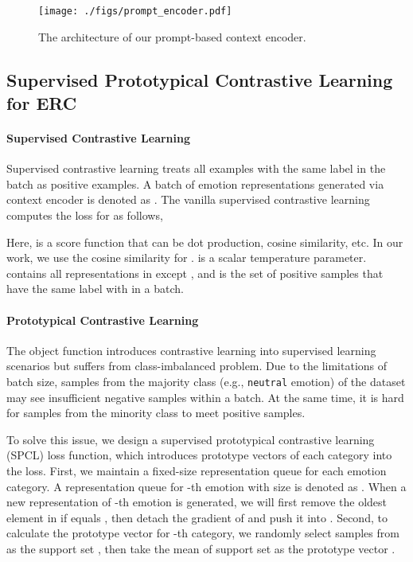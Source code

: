 \documentclass[11pt]{article}
\begin{document}
\begin{figure}
    \centering
    \texttt{[image: ./figs/prompt\_encoder.pdf]}
    \caption{The architecture of our prompt-based context encoder.}
    \label{fig:encoder}
\end{figure}
\subsection{Supervised Prototypical Contrastive Learning for ERC}


\paragraph{Supervised Contrastive Learning}
Supervised contrastive learning\cite{khosla2020supervised} treats all examples with the same label in the batch as positive examples. A batch of  emotion representations generated via context encoder is denoted as . The vanilla supervised contrastive learning computes the loss   for  as follows,






Here,  is a score function that can be dot production, cosine similarity, etc. In our work, we use the cosine similarity for .  is a scalar temperature parameter.  contains all representations in  except , and  is the set of positive samples that have the same label with  in a batch.








\paragraph{Prototypical Contrastive Learning}
The object function  introduces contrastive learning into supervised learning scenarios but suffers from class-imbalanced problem. Due to the limitations of batch size, samples from the majority class (e.g., \texttt{neutral} emotion) of the dataset may see insufficient negative samples within a batch. At the same time, it is hard for samples from the minority class to meet positive samples. 

To solve this issue, we design a supervised prototypical contrastive learning (SPCL) loss function, which introduces prototype vectors of each category into the  loss. First, we maintain a fixed-size representation queue for each emotion category. A representation queue for -th emotion with size  is denoted as . When a new representation  of -th emotion is generated, we will first remove the oldest element in  if  equals , then detach the gradient of  and push it into . Second, to calculate the prototype vector for -th category, we randomly select  samples from  as the support set , then take the mean of support set as the prototype vector .
\end{document}

